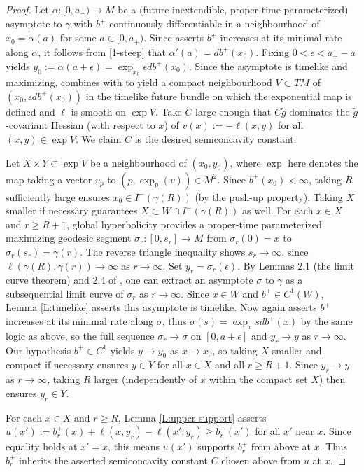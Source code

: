 \documentclass[12pt]{amsart}
\begin{document}
\begin{proof}
Let  $\alpha:[0,a_+)\longrightarrow M$ be a (future inextendible, proper-time parameterized) asymptote to $\gamma$ with $b^+$ continuously differentiable in a neighbourhood of $x_0=\alpha(a)$ for some $a\in [0,a_+)$.
Since \cite[Proposition 2.6]{GallowayHorta96} asserts $b^+$ increases at its minimal rate along $\alpha$,  it follows from \eqref{1-steep} that $\alpha'(a)=db^+(x_0)$.
Fixing $0<\epsilon <a_+-a$ yields $y_0:=\alpha(a+\epsilon) = \exp_{x_0} \epsilon db^+(x_0)$.  Since the asymptote is timelike and maximizing,   \cite[Proposition 9.7]{BeemEhrlichEasley96} combines with 
\cite[Theorem 3.6]{McCann20} to
yield a compact neighbourhood $V \subset TM$ of $(x_0,\epsilon db^+(x_0))$ in the timelike future bundle
on which the exponential map is defined and
$\ell$ is smooth on $\exp V$.  
Take $C$ large enough that $C \tilde g$ dominates the $\tilde g$-covariant Hessian (with respect to $x$) of $v(x):=-\ell(x,y)$ for all $(x,y) \in \exp V$.  
We claim $C$ is the desired semiconcavity constant.

Let $X \times Y \subset \exp V$ be a neighbourhood of $(x_0,y_0)$, where $\exp$ here denotes the map taking a vector $v_p$ to $(p,\exp_p(v)) \in M^2$.
Since $b^+(x_0)<\infty$, taking $R$ sufficiently large ensures $x_0 \in I^-(\gamma(R))$ (by the push-up property). Taking $X$ smaller if necessary guarantees $X \subset W \cap I^-(\gamma(R))$ as well. For each $x \in X$ and $r \ge R+1$, global hyperbolicity provides a proper-time parameterized maximizing geodesic segment $\sigma_r:[0,s_r]\longrightarrow M$ from $\sigma_r(0)=x$ to $\sigma_r(s_r)=\gamma(r)$.  The reverse triangle inequality shows $s_r \to \infty$, since $\ell(\gamma(R),\gamma(r)) \to \infty$ as $r \to \infty$.  
Set $y_r=\sigma_r(\epsilon)$.  
By Lemmas 2.1 (the limit curve theorem) and 2.4 of \cite{GallowayHorta96},  one can extract an asymptote $\sigma$ to $\gamma$ as a subsequential limit curve of $\sigma_r$ as $r \to \infty$.  
Since $x \in W$ and $b^+ \in C^1(W)$,  Lemma \ref{L:timelike}
asserts this asymptote is timelike.
Now \cite[Proposition 2.6]{GallowayHorta96} again asserts $b^+$ increases at its minimal rate along $\sigma$,
thus $\sigma(s)=\exp_x sdb^+(x)$ by the same logic as above,  so the full sequence $\sigma_r \to \sigma$ on $[0,a+\epsilon]$ and $y_r \to y$ as $r \to \infty$.  Our hypothesis $b^+ \in C^1$ yields $y \to y_0$ as $x \to x_0$,  so taking $X$ smaller and compact if necessary ensures $y \in Y$ for all $x \in X$ and all $r \ge R+1$.
Since $y_r \to y$ as $r \to \infty$, taking $R$ larger (independently of $x$ within the compact set $X$) then ensures $y_r \in Y$.

For each $x \in X$ and $r \ge R$, Lemma \ref{L:upper support} asserts $u(x') := b^+_r(x) + \ell(x,y_r) - \ell(x',y_r) \ge b^+_r(x')$ for all $x'$ near $x$. Since equality holds at $x'=x$, this means $u(x')$ supports $b^+_r$ from above at $x$.  
Thus $b^+_r$ inherits the asserted semiconcavity constant $C$ 
chosen above from $u$ at $x$.
\end{proof}
\end{document}
